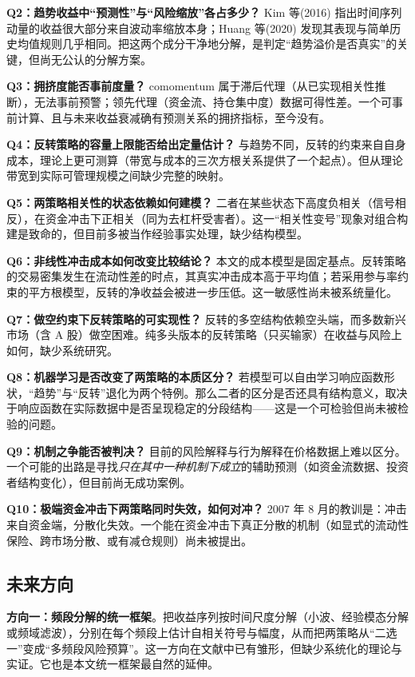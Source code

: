 \textbf{Q2：趋势收益中“预测性”与“风险缩放”各占多少？} Kim 等(2016) 指出时间序列动量的收益很大部分来自波动率缩放本身\cite{kim2016}；Huang 等(2020) 发现其表现与简单历史均值规则几乎相同\cite{huang2020}。把这两个成分干净地分解，是判定“趋势溢价是否真实”的关键，但尚无公认的分解方案。

\textbf{Q3：拥挤度能否事前度量？} comomentum 属于滞后代理（从已实现相关性推断），无法事前预警；领先代理（资金流、持仓集中度）数据可得性差。一个可事前计算、且与未来收益衰减确有预测关系的拥挤指标，至今没有。

\textbf{Q4：反转策略的容量上限能否给出定量估计？} 与趋势不同，反转的约束来自自身成本，理论上更可测算（带宽与成本的三次方根关系提供了一个起点\cite{martin2011}）。但从理论带宽到实际可管理规模之间缺少完整的映射。

\textbf{Q5：两策略相关性的状态依赖如何建模？} 二者在某些状态下高度负相关（信号相反），在资金冲击下正相关（同为去杠杆受害者）。这一“相关性变号”现象对组合构建是致命的，但目前多被当作经验事实处理，缺少结构模型。

\textbf{Q6：非线性冲击成本如何改变比较结论？} 本文的成本模型是固定基点。反转策略的交易密集发生在流动性差的时点，其真实冲击成本高于平均值；若采用参与率约束的平方根模型，反转的净收益会被进一步压低。这一敏感性尚未被系统量化。

\textbf{Q7：做空约束下反转策略的可实现性？} 反转的多空结构依赖空头端，而多数新兴市场（含 A 股）做空困难。纯多头版本的反转策略（只买输家）在收益与风险上如何，缺少系统研究。

\textbf{Q8：机器学习是否改变了两策略的本质区分？} 若模型可以自由学习响应函数形状，“趋势”与“反转”退化为两个特例。那么二者的区分是否还具有结构意义，取决于响应函数在实际数据中是否呈现稳定的分段结构——这是一个可检验但尚未被检验的问题。

\textbf{Q9：机制之争能否被判决？} 目前的风险解释与行为解释在价格数据上难以区分\cite{cochrane2011}。一个可能的出路是寻找\emph{只在其中一种机制下成立}的辅助预测（如资金流数据、投资者结构变化），但目前尚无成功案例。

\textbf{Q10：极端资金冲击下两策略同时失效，如何对冲？} 2007 年 8 月的教训是：冲击来自资金端，分散化失效\cite{khandanilo2011,brunnermeier2009}。一个能在资金冲击下真正分散的机制（如显式的流动性保险、跨市场分散、或有减仓规则）尚未被提出。

\subsection{未来方向}

\textbf{方向一：频段分解的统一框架}。把收益序列按时间尺度分解（小波、经验模态分解或频域滤波），分别在每个频段上估计自相关符号与幅度，从而把两策略从“二选一”变成“多频段风险预算”。这一方向在文献中已有雏形\cite{wood2021}，但缺少系统化的理论与实证。它也是本文统一框架最自然的延伸。

